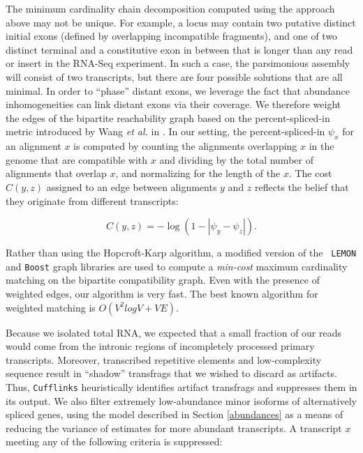 \documentclass[12pt]{amsart}
\theoremstyle{definition}
\begin{document}
The minimum cardinality chain decomposition computed using the approach above may not be unique.
For example, a locus may contain two putative distinct initial exons (defined by overlapping incompatible fragments), and one
of two distinct terminal and a constitutive exon in between that is longer than any
read or insert in the RNA-Seq experiment. In such a case, the parsimonious assembly will consist of two transcripts, but there are four possible solutions that are all minimal. In order to ``phase'' distant exons, we leverage the fact that abundance inhomogeneities can link distant exons via their coverage. We therefore weight the edges of the bipartite reachability graph based on the percent-spliced-in metric introduced by
Wang \emph{et al.} in \cite{Wang2008}. In our setting, the percent-spliced-in
$\psi_x$ for an alignment $x$ is computed by counting the alignments
overlapping $x$ in the genome that are compatible with $x$ and dividing by the
total number of alignments that overlap $x$, and normalizing for the length of
the $x$. The cost $C(y,z)$ assigned to an edge between alignments $y$ and $z$ reflects
the belief that they originate from different transcripts:


\begin{equation}
    C(y,z) = -\log(1 - |\psi_y - \psi_z|).
    \label{eq:match_cost} 
\end{equation}

Rather than using the Hopcroft-Karp algorithm,  a modified version of the {\tt
LEMON} \cite{LEMON} and {\tt Boost} \cite{Boost} graph libraries are used to
compute a {\em min-cost} maximum cardinality matching on the bipartite compatibility
graph. Even with the presence of weighted edges, our algorithm is
very fast. The best known algorithm for weighted matching is $O(V^2logV+VE)$.

Because we isolated total RNA, we
expected that a small fraction of our reads would come from the intronic
regions of incompletely processed primary transcripts. Moreover, transcribed
repetitive elements and low-complexity sequence result in ``shadow''
transfrags that we wished to discard as artifacts. Thus, {\tt Cufflinks}
heuristically identifies artifact transfrags and suppresses them in its
output. We also filter extremely low-abundance minor isoforms of alternatively
spliced genes, using the model described in Section \ref {abundances} as a
means of reducing the variance of estimates for more abundant transcripts. A
transcript $x$ meeting any of the following criteria is suppressed:
\end{document}
